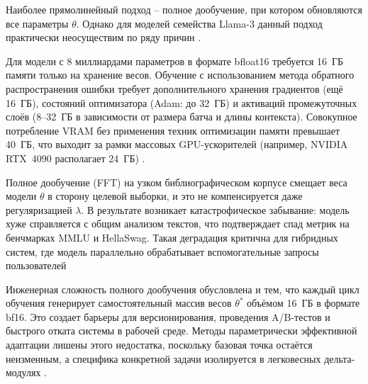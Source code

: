 Наиболее прямолинейный подход -- полное дообучение, при котором обновляются все параметры $\theta$. Однако для моделей семейства Llama-3 данный подход практически неосуществим по ряду причин \cite{liu2023parameter}.

Для модели с 8 миллиардами параметров в формате bfloat16 требуется 16~ГБ памяти только на хранение весов. Обучение с использованием метода обратного распространения ошибки требует дополнительного хранения градиентов (ещё 16~ГБ), состояний оптимизатора (Adam: до 32~ГБ) и активаций промежуточных слоёв (8--32~ГБ в зависимости от размера батча и длины контекста). Совокупное потребление VRAM без применения техник оптимизации памяти превышает 40~ГБ, что выходит за рамки массовых GPU-ускорителей (например, NVIDIA RTX~4090 располагает 24~ГБ) \cite{rajbhandari2019zero, liu2023parameter}.

Полное дообучение (FFT) на узком библиографическом корпусе смещает веса модели $\theta$ в сторону целевой выборки, и это не компенсируется даже регуляризацией $\lambda$. В результате возникает катастрофическое забывание: модель хуже справляется с общим анализом текстов, что подтверждает спад метрик на бенчмарках MMLU и HellaSwag. Такая деградация критична для гибридных систем, где модель параллельно обрабатывает вспомогательные запросы пользователей \cite{hu2022lora, liu2023parameter}

Инженерная сложность полного дообучения обусловлена и тем, что каждый цикл обучения генерирует самостоятельный массив весов $\theta^*$ объёмом 16~ГБ в формате bf16. Это создает барьеры для версионирования, проведения A/B-тестов и быстрого отката системы в рабочей среде. Методы параметрически эффективной адаптации лишены этого недостатка, поскольку базовая точка остаётся неизменным, а специфика конкретной задачи изолируется в легковесных дельта-модулях \cite{hu2022lora}\cite{kaddour2023challenges}. 

